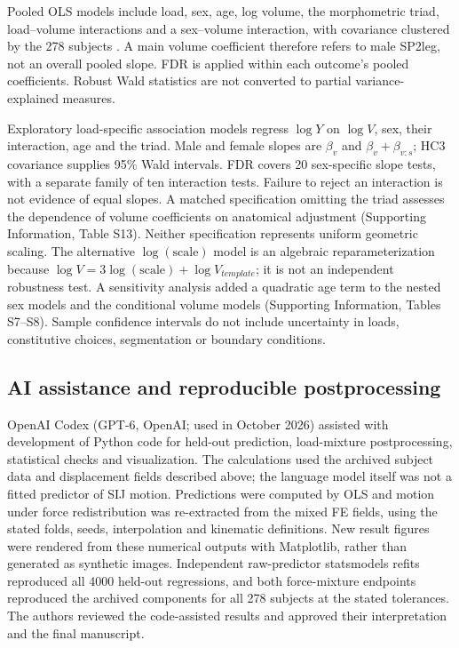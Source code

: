 Pooled OLS models include load, sex, age, log volume, the morphometric triad, load--volume interactions and a sex--volume interaction, with covariance clustered by the 278 subjects \citep{CameronMiller2015}. A main volume coefficient therefore refers to male SP2leg, not an overall pooled slope. FDR is applied within each outcome's pooled coefficients. Robust Wald statistics are not converted to partial variance-explained measures.

Exploratory load-specific association models regress $\log Y$ on $\log V$, sex, their interaction, age and the triad. Male and female slopes are $\beta_v$ and $\beta_v+\beta_{v:s}$; HC3 covariance supplies 95\% Wald intervals. FDR covers 20 sex-specific slope tests, with a separate family of ten interaction tests. Failure to reject an interaction is not evidence of equal slopes. A matched specification omitting the triad assesses the dependence of volume coefficients on anatomical adjustment (Supporting Information, Table S13). Neither specification represents uniform geometric scaling. The alternative $\log(\mathrm{scale})$ model is an algebraic reparameterization because $\log V=3\log(\mathrm{scale})+\log V_{template}$; it is not an independent robustness test. A sensitivity analysis added a quadratic age term to the nested sex models and the conditional volume models (Supporting Information, Tables S7--S8). Sample confidence intervals do not include uncertainty in loads, constitutive choices, segmentation or boundary conditions.

\subsection{AI assistance and reproducible postprocessing}
OpenAI Codex (GPT-6, OpenAI; used in October 2026) assisted with development of Python code for held-out prediction, load-mixture postprocessing, statistical checks and visualization. The calculations used the archived subject data and displacement fields described above; the language model itself was not a fitted predictor of SIJ motion. Predictions were computed by OLS and motion under force redistribution was re-extracted from the mixed FE fields, using the stated folds, seeds, interpolation and kinematic definitions. New result figures were rendered from these numerical outputs with Matplotlib, rather than generated as synthetic images. Independent raw-predictor statsmodels refits reproduced all 4000 held-out regressions, and both force-mixture endpoints reproduced the archived components for all 278 subjects at the stated tolerances. The authors reviewed the code-assisted results and approved their interpretation and the final manuscript.
